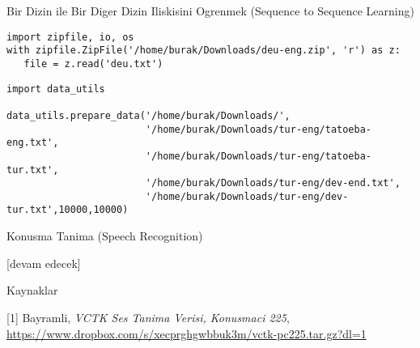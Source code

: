 \documentclass[12pt,fleqn]{article}\usepackage{../../common}
\begin{document}
Bir Dizin ile Bir Diger Dizin Iliskisini Ogrenmek (Sequence to Sequence Learning)

\begin{verbatim}
import zipfile, io, os
with zipfile.ZipFile('/home/burak/Downloads/deu-eng.zip', 'r') as z:
   file = z.read('deu.txt')
\end{verbatim}

\begin{verbatim}
import data_utils

data_utils.prepare_data('/home/burak/Downloads/', 
                        '/home/burak/Downloads/tur-eng/tatoeba-eng.txt', 
                        '/home/burak/Downloads/tur-eng/tatoeba-tur.txt', 
                        '/home/burak/Downloads/tur-eng/dev-end.txt',
                        '/home/burak/Downloads/tur-eng/dev-tur.txt',10000,10000) 
\end{verbatim}




















Konusma Tanima (Speech Recognition)












[devam edecek]

Kaynaklar

[1] Bayramli, {\em VCTK Ses Tanima Verisi, Konusmaci 225}, \url{https://www.dropbox.com/s/xecprghgwbbuk3m/vctk-pc225.tar.gz?dl=1}
\end{document}
